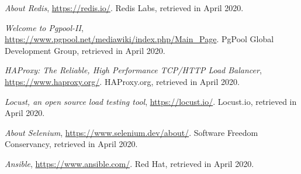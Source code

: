 \documentclass[12pt]{article}
\begin{document}
\begin{thebibliography}{9}
  \textit{About Redis},
  \url{https://redis.io/}.
  Redis Labs,
  retrieved in April 2020.
  \vspace{-10pt}

  \textit{Welcome to Pgpool-II},
  \url{https://www.pgpool.net/mediawiki/index.php/Main_Page}.
  PgPool Global Development Group,
  retrieved in April 2020.
  \vspace{-10pt}

  \textit{HAProxy: The Reliable, High Performance TCP/HTTP Load Balancer},
  \url{https://www.haproxy.org/}.
  HAProxy.org,
  retrieved in April 2020.
  \vspace{-10pt}

  \textit{Locust, an open source load testing tool},
  \url{https://locust.io/}.
  Locust.io,
  retrieved in April 2020.
  \vspace{-10pt}

  \textit{About Selenium},
  \url{https://www.selenium.dev/about/}.
  Software Freedom Conservancy,
  retrieved in April 2020.
  \vspace{-10pt}

  \textit{Ansible},
  \url{https://www.ansible.com/}.
  Red Hat,
  retrieved in April 2020.

\end{thebibliography}

\clearpage
\end{document}
